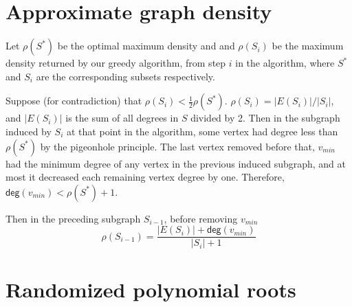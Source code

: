 \documentclass[12pt]{article}
\begin{document}
\section{Approximate graph density}

Let $\rho(S^*)$ be the optimal maximum density and
and $\rho(S_i)$ be the maximum density returned by our
greedy algorithm, from step $i$ in the algorithm,
where $S^*$ and $S_i$ are the corresponding subsets
respectively.

Suppose (for contradiction) that $\rho(S_i) < \frac{1}{2}\rho(S^*)$.
$\rho(S_i) = |E(S_i)| / |S_i|$, and $|E(S_i)|$ is the sum of all degrees in $S$
divided by 2.
 Then in the
subgraph induced by $S_i$ at that point in the algorithm, some vertex
had degree less than $\rho(S^*)$ by the pigeonhole principle.
The last vertex removed before that,
$v_{min}$ had the minimum degree of any vertex in the previous induced
subgraph, and at most it decreased each remaining vertex degree by one.
Therefore, $\textsf{deg}(v_{min}) < \rho(S^*) + 1$.

Then in the preceding subgraph $S_{i-1}$, before removing $v_{min}$
%
\begin{displaymath}
\rho(S_{i-1}) = \frac{|E(S_i)| + \textsf{deg}(v_{min})}{|S_i|+1}
\end{displaymath}


\pagebreak

\section{Randomized polynomial roots}
\end{document}

